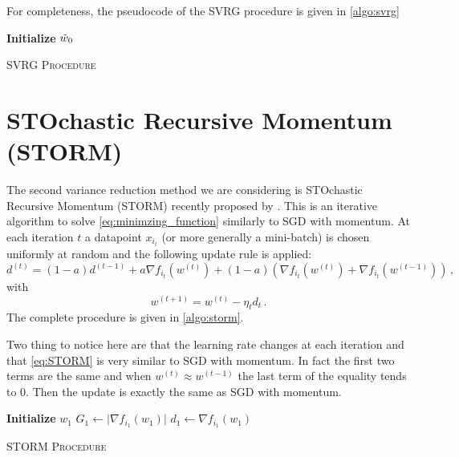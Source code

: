 \documentclass[a4paper,11pt,oneside]{report}
\begin{document}
For completeness, the pseudocode of the SVRG procedure is given in \autoref{algo:svrg}

\begin{algorithm}[H]
    \DontPrintSemicolon
    \SetAlgoNoLine
    
    \textbf{Initialize} $\Tilde{w}_0$\;
    \caption{{\textsc{SVRG Procedure}}}
    \label{algo:svrg}
\end{algorithm}

\section{STOchastic Recursive Momentum (STORM)}
The second variance reduction method we are considering is STOchastic Recursive Momentum (STORM) recently proposed by \citeauthor{Cutkosky2019storm}. This is an iterative algorithm to solve \autoref{eq:minimzing_function} similarly to SGD with momentum. At each iteration $t$ a datapoint $x_{i_t}$ (or more generally a mini-batch) is chosen uniformly at random and the following update rule is applied:
\begin{equation}\label{eq:STORM}
    d^{(t)} = (1-a)d^{(t-1)} + a\nabla f_{i_t}(w^{(t)}) + (1-a)(\nabla f_{i_t}(w^{(t)}) +  \nabla f_{i_t}(w^{(t-1)}))\,,
\end{equation}
with
\begin{equation}
    w^{(t+1)} = w^{(t)} - \eta_t d_t\,.
\end{equation}
The complete procedure is given in \autoref{algo:storm}.

Two thing to notice here are that the learning rate changes at each iteration and that \autoref{eq:STORM} is very similar to SGD with momentum. In fact the first two terms are the same and when $w^{(t)} \approx w^{(t-1)}$ the last term of the equality tends to 0. Then the update is exactly the same as SGD with momentum.

\begin{algorithm}[H]
    \DontPrintSemicolon
    \SetAlgoNoLine

    \textbf{Initialize} $w_1$\;
    $G_1 \gets \mathopen| {\nabla f_{i_1}(w_1)}\mathclose|$\;
    $d_1 \gets \nabla f_{i_1}(w_1)$\;
    \caption{{\textsc{STORM Procedure}}}
    \label{algo:storm}
\end{algorithm}
\end{document}

